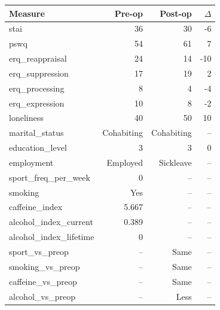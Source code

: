 \begin{longtable}{p{.47\linewidth}rrr}
\toprule Measure & Pre-op & Post-op & $\Delta$ \\
\midrule\endhead
{\ttfamily\footnotesize stai} & 36 & 30 & -6 \\
{\ttfamily\footnotesize pswq} & 54 & 61 & 7 \\
{\ttfamily\footnotesize erq\_\allowbreak{}reappraisal} & 24 & 14 & -10 \\
{\ttfamily\footnotesize erq\_\allowbreak{}suppression} & 17 & 19 & 2 \\
{\ttfamily\footnotesize erq\_\allowbreak{}processing} & 8 & 4 & -4 \\
{\ttfamily\footnotesize erq\_\allowbreak{}expression} & 10 & 8 & -2 \\
{\ttfamily\footnotesize loneliness} & 40 & 50 & 10 \\
{\ttfamily\footnotesize marital\_\allowbreak{}status} & Cohabiting & Cohabiting & -- \\
{\ttfamily\footnotesize education\_\allowbreak{}level} & 3 & 3 & 0 \\
{\ttfamily\footnotesize employment} & Employed & Sickleave & -- \\
{\ttfamily\footnotesize sport\_\allowbreak{}freq\_\allowbreak{}per\_\allowbreak{}week} & 0 & -- & -- \\
{\ttfamily\footnotesize smoking} & Yes & -- & -- \\
{\ttfamily\footnotesize caffeine\_\allowbreak{}index} & 5.667 & -- & -- \\
{\ttfamily\footnotesize alcohol\_\allowbreak{}index\_\allowbreak{}current} & 0.389 & -- & -- \\
{\ttfamily\footnotesize alcohol\_\allowbreak{}index\_\allowbreak{}lifetime} & 0 & -- & -- \\
{\ttfamily\footnotesize sport\_\allowbreak{}vs\_\allowbreak{}preop} & -- & Same & -- \\
{\ttfamily\footnotesize smoking\_\allowbreak{}vs\_\allowbreak{}preop} & -- & Same & -- \\
{\ttfamily\footnotesize caffeine\_\allowbreak{}vs\_\allowbreak{}preop} & -- & Same & -- \\
{\ttfamily\footnotesize alcohol\_\allowbreak{}vs\_\allowbreak{}preop} & -- & Less & -- \\
\bottomrule\end{longtable}
